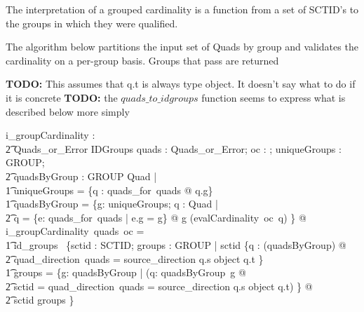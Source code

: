 \documentclass{article}
\begin{document}
The interpretation of a grouped cardinality is a function from a set of SCTID's to the groups in which they were qualified.

The algorithm below partitions the input set of Quads by group and validates the cardinality on a per-group basis.  Groups that
pass are returned

\textbf{TODO:} This assumes that q.t is always type object. It doesn't say what to do if it is concrete
\textbf{TODO:} the $quads\_to\_idgroups$ function seems to express what is described below more simply
\begin{gendef}
   i\_groupCardinality : \\
\t2 Quads\_or\_Error \fun \optional[cardinality] \fun IDGroups
\where
   \forall quads : Quads\_or\_Error; oc : \optional[cardinality]; uniqueGroups : \power GROUP; \\
\t2 quadsByGroup : GROUP \pfun \power Quad |  \\
\t1    uniqueGroups = \{q : quads\_for~quads @ q.g\}  \land \\
\t1    quadsByGroup = \{g: uniqueGroups; q : \power Quad | \\
\t2 q = \{e: quads\_for~quads | e.g = g\}  @ g \mapsto (evalCardinality~oc~q) \} @ \\
i\_groupCardinality~quads~oc = \\
\t1 id\_groups~ \{sctid : SCTID; groups : \power GROUP | sctid \in \{q : \bigcup (\ran quadsByGroup) @ \\
\t2  \IF quad\_direction~quads = source\_direction \THEN q.s \ELSE object \inv q.t \} \land \\
\t1 groups = \{g: \dom quadsByGroup | (\exists q: quadsByGroup~g @ \\
\t2 sctid = \IF quad\_direction~quads = source\_direction \THEN q.s \ELSE object \inv q.t) \} @ \\
\t2 sctid \mapsto groups \}
\end{gendef}
\end{document}
